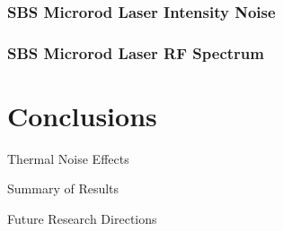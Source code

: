 \documentclass{beamer}
\begin{document}
\begin{frame}\frametitle{SBS Microrod Laser Intensity Noise}
\end{frame}

\begin{frame}\frametitle{SBS Microrod Laser RF Spectrum}
\end{frame}

\section{Conclusions}

\begin{frame}{Thermal Noise Effects}
\end{frame}

\begin{frame}{Summary of Results}
\end{frame}

\begin{frame}{Future Research Directions}
\end{frame}
\end{document}
